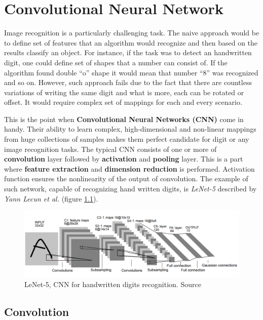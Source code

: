 \chapter{Convolutional Neural Network}
\label{cha:conv}

Image recognition is a particularly challenging task. The naive approach would be to define set of features that an algorithm would recognize and then based on the results classify an object. For instance, if the task was to detect an handwritten digit, one could define set of shapes that a number can consist of. If the algorithm found double ``o'' shape it would mean that number ``8'' was recognized and so on. However, such approach fails due to the fact that there are countless variations of writing the same digit and what is more, each can be rotated or offset. It would require complex set of mappings for each and every scenario.

This is the point when \textbf{Convolutional Neural Networks (CNN)} come in handy. Their ability to learn complex, high-dimensional and non-linear mappings from huge collections of samples makes them perfect candidate for digit or any image recognition tasks. The typical CNN consists of one or more of \textbf{convolution} layer followed by \textbf{activation} and \textbf{pooling} layer. This is a part where \textbf{feature extraction} and \textbf{dimension reduction} is performed. Activation function ensures the nonlinearity of the output of convolution. The example of such network, capable of recognizing hand written digits, is \emph{LeNet-5} described by \emph{Yann Lecun et al.} \cite{GradientBasedLearningDigitRec} (figure \ref{fig:le-net-5}).

\begin{figure}[h]
    \centering
    \includegraphics[width=14cm]{img/LeNet-5.png}
    \caption{LeNet-5, CNN for handwritten digits recognition. Source \cite{GradientBasedLearningDigitRec}}
    \label{fig:le-net-5}
\end{figure}

\section{Convolution}
\label{sec:convolution}

